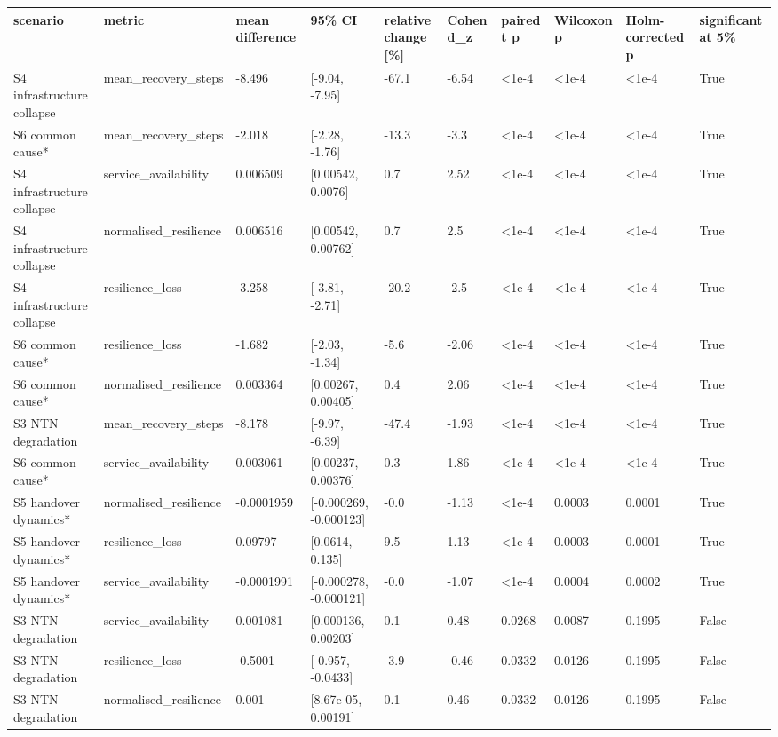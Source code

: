 \begin{tabular}{llllllllll}
\toprule
scenario & metric & mean difference & 95\% CI & relative change [\%] & Cohen d\_z & paired t p & Wilcoxon p & Holm-corrected p & significant at 5\% \\
\midrule
S4 infrastructure collapse & mean\_recovery\_steps & -8.496 & [-9.04, -7.95] & -67.1 & -6.54 & <1e-4 & <1e-4 & <1e-4 & True \\
S6 common cause* & mean\_recovery\_steps & -2.018 & [-2.28, -1.76] & -13.3 & -3.3 & <1e-4 & <1e-4 & <1e-4 & True \\
S4 infrastructure collapse & service\_availability & 0.006509 & [0.00542, 0.0076] & 0.7 & 2.52 & <1e-4 & <1e-4 & <1e-4 & True \\
S4 infrastructure collapse & normalised\_resilience & 0.006516 & [0.00542, 0.00762] & 0.7 & 2.5 & <1e-4 & <1e-4 & <1e-4 & True \\
S4 infrastructure collapse & resilience\_loss & -3.258 & [-3.81, -2.71] & -20.2 & -2.5 & <1e-4 & <1e-4 & <1e-4 & True \\
S6 common cause* & resilience\_loss & -1.682 & [-2.03, -1.34] & -5.6 & -2.06 & <1e-4 & <1e-4 & <1e-4 & True \\
S6 common cause* & normalised\_resilience & 0.003364 & [0.00267, 0.00405] & 0.4 & 2.06 & <1e-4 & <1e-4 & <1e-4 & True \\
S3 NTN degradation & mean\_recovery\_steps & -8.178 & [-9.97, -6.39] & -47.4 & -1.93 & <1e-4 & <1e-4 & <1e-4 & True \\
S6 common cause* & service\_availability & 0.003061 & [0.00237, 0.00376] & 0.3 & 1.86 & <1e-4 & <1e-4 & <1e-4 & True \\
S5 handover dynamics* & normalised\_resilience & -0.0001959 & [-0.000269, -0.000123] & -0.0 & -1.13 & <1e-4 & 0.0003 & 0.0001 & True \\
S5 handover dynamics* & resilience\_loss & 0.09797 & [0.0614, 0.135] & 9.5 & 1.13 & <1e-4 & 0.0003 & 0.0001 & True \\
S5 handover dynamics* & service\_availability & -0.0001991 & [-0.000278, -0.000121] & -0.0 & -1.07 & <1e-4 & 0.0004 & 0.0002 & True \\
S3 NTN degradation & service\_availability & 0.001081 & [0.000136, 0.00203] & 0.1 & 0.48 & 0.0268 & 0.0087 & 0.1995 & False \\
S3 NTN degradation & resilience\_loss & -0.5001 & [-0.957, -0.0433] & -3.9 & -0.46 & 0.0332 & 0.0126 & 0.1995 & False \\
S3 NTN degradation & normalised\_resilience & 0.001 & [8.67e-05, 0.00191] & 0.1 & 0.46 & 0.0332 & 0.0126 & 0.1995 & False \\

\end{tabular}
